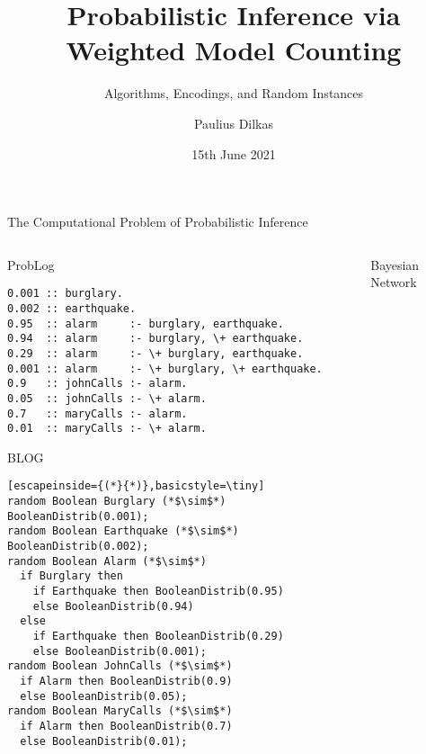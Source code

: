 \documentclass{beamer}
\author{Paulius Dilkas}
\title{Probabilistic Inference via Weighted Model Counting}
\subtitle{Algorithms, Encodings, and Random Instances}
\date{15th June 2021}
\begin{document}
\maketitle

\begin{frame}[fragile]{The Computational Problem of Probabilistic Inference}
  \vspace{-0.75cm}
  \begin{columns}[t]
    \begin{column}{0.65\textwidth}
      \centering
      \begin{block}{ProbLog}
        \vspace{-0.2cm}
        \begin{lstlisting}[basicstyle=\tiny]
0.001 :: burglary.
0.002 :: earthquake.
0.95  :: alarm     :- burglary, earthquake.
0.94  :: alarm     :- burglary, \+ earthquake.
0.29  :: alarm     :- \+ burglary, earthquake.
0.001 :: alarm     :- \+ burglary, \+ earthquake.
0.9   :: johnCalls :- alarm.
0.05  :: johnCalls :- \+ alarm.
0.7   :: maryCalls :- alarm.
0.01  :: maryCalls :- \+ alarm.
        \end{lstlisting}
        \vspace{-0.2cm}
      \end{block}
      \vspace{-0.25cm}
      \begin{block}{BLOG}
        \vspace{-0.2cm}
        \begin{lstlisting}[escapeinside={(*}{*)},basicstyle=\tiny]
random Boolean Burglary (*$\sim$*) BooleanDistrib(0.001);
random Boolean Earthquake (*$\sim$*) BooleanDistrib(0.002);
random Boolean Alarm (*$\sim$*)
  if Burglary then
    if Earthquake then BooleanDistrib(0.95)
    else BooleanDistrib(0.94)
  else
    if Earthquake then BooleanDistrib(0.29)
    else BooleanDistrib(0.001);
random Boolean JohnCalls (*$\sim$*)
  if Alarm then BooleanDistrib(0.9)
  else BooleanDistrib(0.05);
random Boolean MaryCalls (*$\sim$*)
  if Alarm then BooleanDistrib(0.7)
  else BooleanDistrib(0.01);
        \end{lstlisting}
        \vspace{-0.2cm}
      \end{block}
    \end{column}
    \begin{column}{0.35\textwidth}
      \begin{block}{Bayesian Network}
        \centering
        \begin{tikzpicture}[node distance=2cm,scale=0.5,every node/.style={scale=0.5}]

\end{tikzpicture}
\end{block}
\end{column}
\end{columns}
\end{frame}
\end{document}
